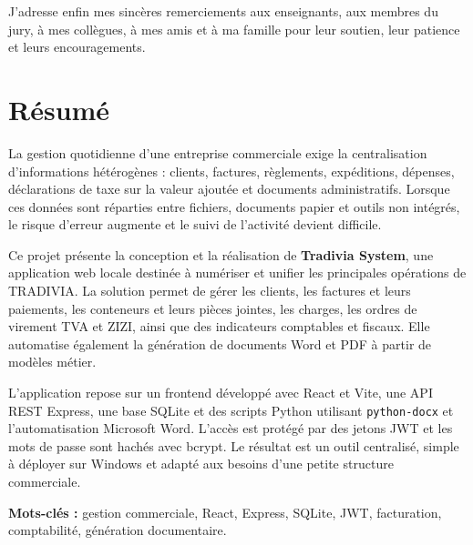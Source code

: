 \documentclass[12pt,a4paper,oneside]{report}
\newcommand{\code}[1]{\texttt{#1}}
\begin{document}
J'adresse enfin mes sincères remerciements aux enseignants, aux membres du jury, à mes collègues, à mes amis et à ma famille pour leur soutien, leur patience et leurs encouragements.

\chapter*{Résumé}
La gestion quotidienne d'une entreprise commerciale exige la centralisation d'informations hétérogènes : clients, factures, règlements, expéditions, dépenses, déclarations de taxe sur la valeur ajoutée et documents administratifs. Lorsque ces données sont réparties entre fichiers, documents papier et outils non intégrés, le risque d'erreur augmente et le suivi de l'activité devient difficile.

Ce projet présente la conception et la réalisation de \textbf{Tradivia System}, une application web locale destinée à numériser et unifier les principales opérations de TRADIVIA. La solution permet de gérer les clients, les factures et leurs paiements, les conteneurs et leurs pièces jointes, les charges, les ordres de virement TVA et ZIZI, ainsi que des indicateurs comptables et fiscaux. Elle automatise également la génération de documents Word et PDF à partir de modèles métier.

L'application repose sur un frontend développé avec React et Vite, une API REST Express, une base SQLite et des scripts Python utilisant \code{python-docx} et l'automatisation Microsoft Word. L'accès est protégé par des jetons JWT et les mots de passe sont hachés avec bcrypt. Le résultat est un outil centralisé, simple à déployer sur Windows et adapté aux besoins d'une petite structure commerciale.

\textbf{Mots-clés :} gestion commerciale, React, Express, SQLite, JWT, facturation, comptabilité, génération documentaire.
\end{document}
